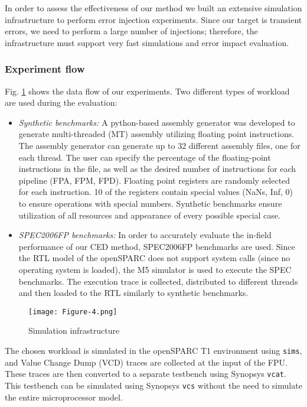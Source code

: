 \documentclass[12pt]{yalephd}
\begin{document}
In order to assess the effectiveness of our method we built an extensive simulation infrastructure to perform error injection experiments. Since our target is transient errors, we need to perform a large number of injections; therefore, the infrastructure must support very fast simulations and error impact evaluation.

\subsubsection{Experiment flow}

Fig. \ref{sC3fInfr} shows the data flow of our experiments. Two different types of workload are used during the evaluation:

\begin{itemize}
	\item {\em Synthetic benchmarks:} A python-based assembly generator was developed to generate multi-threaded (MT) assembly utilizing floating point instructions. The assembly generator can generate up to 32 different assembly files, one for each thread. The user can specify the percentage of the floating-point instructions in the file, as well as the desired number of instructions for each pipeline (FPA, FPM, FPD). Floating point registers are randomly selected for each instruction. 10 of the registers contain special values (NaNs, Inf, 0) to ensure operations with special numbers. Synthetic benchmarks ensure utilization of all resources and appearance of every possible special case.
	\item {\em SPEC2006FP benchmarks:} In order to accurately evaluate the in-field performance of our CED method, SPEC2006FP benchmarks are used. Since the RTL model of the openSPARC does not support system calls (since no operating system is loaded), the M5 simulator \cite{reinhardt2005using} is used to execute the SPEC benchmarks. The execution trace is collected, distributed to different threads and then loaded to the RTL similarly to synthetic benchmarks.
\end{itemize}

\begin{figure}[!ht]
\centering
\texttt{[image: Figure-4.png]}
\caption{Simulation infrastructure}\label{sC3fInfr}
\end{figure}

The chosen workload is simulated in the openSPARC T1 environment using {\tt sims}, and Value Change Dump (VCD) traces are collected at the input of the FPU. These traces are then converted to a separate testbench using Synopsys {\tt vcat}. This testbench can be simulated using Synopsys {\tt vcs} without the need to simulate the entire microprocessor model.
\end{document}
